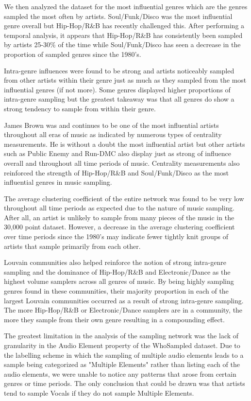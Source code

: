 \documentclass[pageno]{jpaper}
\begin{document}
We then analyzed the dataset for the most influential genres which are the genres sampled the most often by artists. Soul/Funk/Disco was the most influential genre overall but Hip-Hop/R\&B has recently challenged this. After performing a temporal analysis, it appears that Hip-Hop/R\&B has consistently been sampled by artists 25-30\% of the time while Soul/Funk/Disco has seen a decrease in the proportion of sampled genres since the 1980's.

Intra-genre influences were found to be strong and artists noticeably sampled from other artists within their genre just as much as they sampled from the most influential genres (if not more). Some genres displayed higher proportions of intra-genre sampling but the greatest takeaway was that all genres do show a strong tendency to sample from within their genre.

James Brown was and continues to be one of the most influential artists throughout all eras of music as indicated by numerous types of centrality measurements. He is without a doubt the most influential artist but other artists such as Public Enemy and Run-DMC also display just as strong of influence overall and throughout all time periods of music. Centrality measurements also reinforced the strength of Hip-Hop/R\&B and Soul/Funk/Disco as the most influential genres in music sampling.

The average clustering coefficient of the entire network was found to be very low throughout all time periods as expected due to the nature of music sampling. After all, an artist is unlikely to sample from many pieces of the music in the 30,000 point dataset. However, a decrease in the average clustering coefficient over time periods since the 1980's may indicate fewer tightly knit groups of artists that sample primarily from each other.

Louvain communities also helped reinforce the notion of strong intra-genre sampling and the dominance of Hip-Hop/R\&B and Electronic/Dance as the highest volume samplers across all genres of music. By being highly sampling genres found in these communities, their majority proportion in each of the largest Louvain communities occurred as a result of strong intra-genre sampling. The more Hip-Hop/R\&B or Electronic/Dance samplers are in a community, the more they sample from their own genre resulting in a compounding effect.

The greatest limitation in the analysis of the sampling network was the lack of granularity in the Audio Element property of the WhoSampled dataset. Due to the labelling scheme in which the sampling of multiple audio elements leads to a sample being categorized as "Multiple Elements" rather than listing each of the audio elements, we were unable to notice any patterns that arose from certain genres or time periods. The only conclusion that could be drawn was that artists tend to sample Vocals if they do not sample Multiple Elements.
\end{document}
